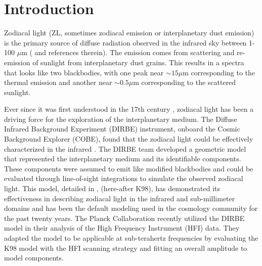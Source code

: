 \documentclass{aa}
\begin{document}

   \maketitle

\setcounter{tocdepth}{3}
\tableofcontents
   
\section{Introduction}
Zodiacal light (ZL, sometimes zodiacal emission or interplanetary dust emission) is the primary source of diffuse radiation observed in the infrared sky between 1-100 $\mu$m (\cite{leinert1998} and references therein). The emission comes from scattering and re-emission of sunlight from interplanetary dust grains. This results in a spectra that looks like two blackbodies, with one peak near $\sim 15\mu$m corresponding to the thermal emission and another near $\sim 0.5 \mu$m corresponding to the scattered sunlight.

Ever since it was first understood in the 17th century \citep{cassini}, zodiacal light has been a driving force for the exploration of the interplanetary medium. The Diffuse Infrared Background Experiment (DIRBE) instrument, onboard the Cosmic Background Explorer (COBE), found that the zodiacal light could be effectively characterized in the infrared \citep{mather:1994, hauser:1998}. The DIRBE team developed a geometric model that represented the interplanetary medium and its identifiable components.
These components were assumed to emit like modified blackbodies and could be evaluated through line-of-sight integrations to simulate the observed zodiacal light. This model, detailed in \cite{K98}, (here-after K98), has demonstrated its effectiveness in describing zodiacal light in the infrared and sub-millimeter domains and has been the default modeling used in the cosmology community for the past twenty years. The Planck Collaboration \citep{PLANCK2013, PLANCK2015, PLANCK2018} recently utilized the DIRBE model in their analysis of the High Frequency Instrument (HFI) data. They adapted the model to be applicable at sub-terahertz frequencies by evaluating the K98 model with the HFI scanning strategy and fitting an overall amplitude to model components.
\end{document}
